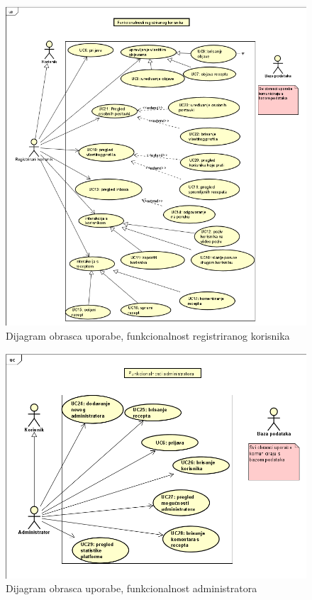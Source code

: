 					\begin{figure}[H]
						\includegraphics[scale=0.5]{slike/UC_reg.png} %
						\centering
						\caption{Dijagram obrasca uporabe, funkcionalnost registriranog korisnika}
						\label{fig:UC_diagram2}
					\end{figure}

					\begin{figure}[H]
						\includegraphics[scale=0.5]{slike/UC_admin.png} %
						\centering
						\caption{Dijagram obrasca uporabe, funkcionalnost administratora}
						\label{fig:UC_diagram3}
					\end{figure}
				\eject		
				
